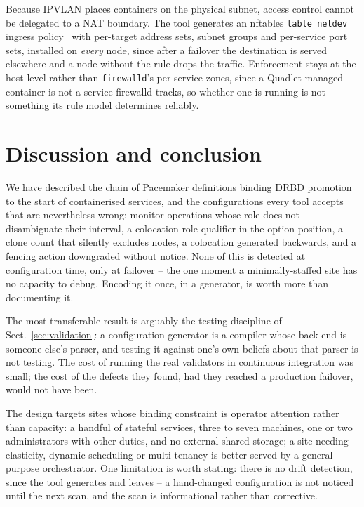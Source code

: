\documentclass{webofc}
\begin{document}
Because IPVLAN places containers on the physical subnet, access control
cannot be delegated to a NAT boundary. The tool generates an nftables
\texttt{table netdev} ingress policy~\cite{nftables} with per-target
address sets, subnet groups and per-service port sets, installed on
\emph{every} node, since after a failover the destination is served
elsewhere and a node without the rule drops the traffic. Enforcement
stays at the host level rather than \texttt{firewalld}'s per-service
zones, since a Quadlet-managed container is not a service firewalld
tracks, so whether one is running is not something its rule model
determines reliably.

\section{Discussion and conclusion}
\label{sec:discussion}

We have described the chain of Pacemaker definitions binding DRBD
promotion to the start of containerised services, and the configurations
every tool accepts that are nevertheless wrong: monitor operations whose
role does not disambiguate their interval, a colocation role qualifier
in the option position, a clone count that silently excludes nodes, a
colocation generated backwards, and a fencing action downgraded without
notice. None of this is detected at configuration time, only at failover
-- the one moment a minimally-staffed site has no capacity to debug.
Encoding it once, in a generator, is worth more than documenting it.

The most transferable result is arguably the testing discipline of
Sect.~\ref{sec:validation}: a configuration generator is a compiler whose
back end is someone else's parser, and testing it against one's own
beliefs about that parser is not testing. The cost of running the real
validators in continuous integration was small; the cost of the defects
they found, had they reached a production failover, would not have been.

The design targets sites whose binding constraint is operator attention
rather than capacity: a handful of stateful services, three to seven
machines, one or two administrators with other duties, and no external
shared storage; a site needing elasticity, dynamic scheduling or
multi-tenancy is better served by a general-purpose orchestrator. One
limitation is worth stating: there is no drift detection, since the tool
generates and leaves -- a hand-changed configuration is not noticed
until the next scan, and the scan is informational rather than
corrective.
\end{document}
